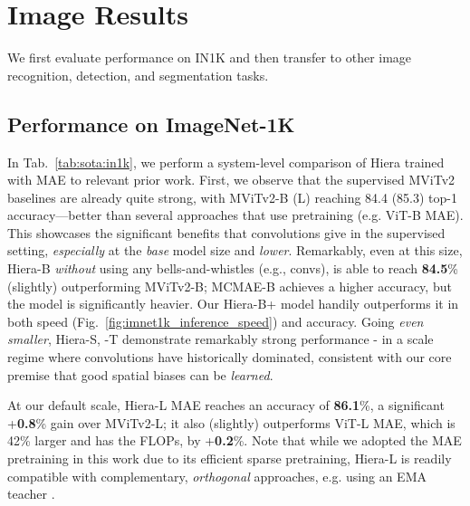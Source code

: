 \documentclass[nohyperref]{article}
\newcommand{\shortname}{{Hiera}}
\theoremstyle{plain}
\theoremstyle{definition}
\theoremstyle{remark}
\begin{document}
\section{Image Results} \label{sec:image_experiments}
We first evaluate performance on IN1K and then transfer to other image recognition, detection, and segmentation tasks.


\subsection{Performance on ImageNet-1K}

In Tab.~\ref{tab:sota:in1k}, we perform a system-level comparison of \shortname{} trained with MAE to relevant prior work. First, we observe that the supervised MViTv2 baselines are already quite strong, with MViTv2-B (L) reaching 84.4 (85.3) top-1 accuracy---better than several approaches that use pretraining (e.g. ViT-B MAE). This showcases the significant benefits that convolutions give in the supervised setting, \textit{especially} at the \textit{base} model size and \textit{lower}. Remarkably, even at this size, \shortname{-B} \textit{without} using any bells-and-whistles (e.g., convs), is able to reach \textbf{84.5}\% (slightly) outperforming MViTv2-B; MCMAE-B achieves a higher accuracy, but the model is significantly heavier. Our \shortname{-B+} model handily outperforms it in both speed (Fig.~\ref{fig:imnet1k_inference_speed}) and accuracy. Going \textit{even smaller}, \shortname{-S}, -T demonstrate remarkably strong performance - in a scale regime where convolutions have historically dominated, consistent with our core premise that good spatial biases can be \textit{learned}.

At our default scale, \shortname{-L} MAE reaches an accuracy of \textbf{86.1}\%, a significant +\textbf{0.8}\% gain over MViTv2-L; it also (slightly) outperforms ViT-L MAE, which is 42\% larger and has  the FLOPs, by +\textbf{0.2}\%. 
Note that while we adopted the MAE pretraining in this work due to its efficient sparse pretraining, \shortname{-L} is readily compatible with complementary, \textit{orthogonal} approaches, e.g. using an EMA teacher \cite{splitmask,data2vec}.
\end{document}
